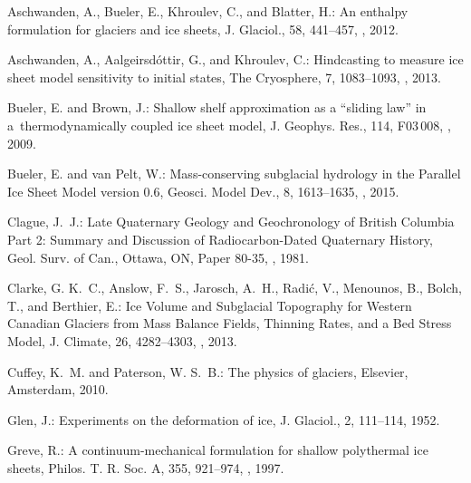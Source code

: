 \begin{thebibliography}{69}

Aschwanden, A., Bueler, E., Khroulev, C., and Blatter, H.: An enthalpy
  formulation for glaciers and ice sheets, J. Glaciol., 58, 441--457,
  , 2012.

Aschwanden, A., A{\dh}algeirsd\'{o}ttir, G., and Khroulev, C.: Hindcasting to
  measure ice sheet model sensitivity to initial states, The Cryosphere, 7,
  1083--1093, , 2013.

Bueler, E. and Brown, J.: Shallow shelf approximation as a ``sliding law'' in
  a~thermodynamically coupled ice sheet model, J. Geophys. Res., 114, F03\,008,
  , 2009.

Bueler, E. and van Pelt, W.: Mass-conserving subglacial hydrology in the
  Parallel Ice Sheet Model version 0.6, Geosci. Model Dev., 8, 1613--1635,
  , 2015.

Clague, J.~J.: Late Quaternary Geology and Geochronology of British Columbia
  Part 2: Summary and Discussion of Radiocarbon-Dated Quaternary History, Geol.
  Surv. of Can., Ottawa, ON, Paper 80-35, , 1981.

Clarke, G. K.~C., Anslow, F.~S., Jarosch, A.~H., Radi{\'{c}}, V., Menounos, B.,
  Bolch, T., and Berthier, E.: Ice Volume and Subglacial Topography for Western
  Canadian Glaciers from Mass Balance Fields, Thinning Rates, and a Bed Stress
  Model, J. Climate, 26, 4282--4303, , 2013.

Cuffey, K.~M. and Paterson, W. S.~B.: The physics of glaciers, Elsevier,
  Amsterdam, 2010.

Glen, J.: Experiments on the deformation of ice, J. Glaciol., 2, 111--114,
  1952.

Greve, R.: A continuum-mechanical formulation for shallow polythermal ice
  sheets, Philos. T. R. Soc. A, 355, 921--974, ,
  1997.


\end{thebibliography}
